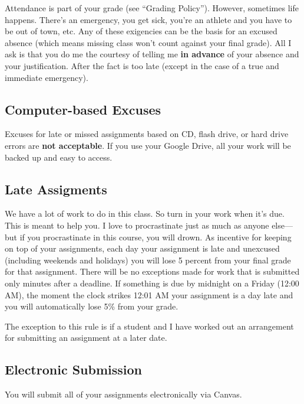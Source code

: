 \documentclass[11pt,]{article}
\begin{document}
Attendance is part of your grade (see ``Grading Policy''). However,
sometimes life happens. There's an emergency, you get sick, you're an
athlete and you have to be out of town, etc. Any of these exigencies can
be the basis for an excused absence (which means missing class won't
count against your final grade). All I ask is that you do me the
courtesy of telling me \textbf{in advance} of your absence and your
justification. After the fact is too late (except in the case of a true
and immediate emergency).

\hypertarget{computer-based-excuses}{%
\subsection{Computer-based Excuses}\label{computer-based-excuses}}

Excuses for late or missed assignments based on CD, flash drive, or hard
drive errors are \textbf{not acceptable}. If you use your Google Drive,
all your work will be backed up and easy to access.

\hypertarget{late-assigments}{%
\subsection{Late Assigments}\label{late-assigments}}

We have a lot of work to do in this class. So turn in your work when
it's due. This is meant to help you. I love to procrastinate just as
much as anyone else---but if you procrastinate in this course, you will
drown. As incentive for keeping on top of your assignments, each day
your assignment is late and unexcused (including weekends and holidays)
you will lose 5 percent from your final grade for that assignment. There
will be no exceptions made for work that is submitted only minutes after
a deadline. If something is due by midnight on a Friday (12:00 AM), the
moment the clock strikes 12:01 AM your assignment is a day late and you
will automatically lose 5\% from your grade.

The exception to this rule is if a student and I have worked out an
arrangement for submitting an assignment at a later date.

\hypertarget{electronic-submission}{%
\subsection{Electronic Submission}\label{electronic-submission}}

You will submit all of your assignments electronically via Canvas.
\end{document}
